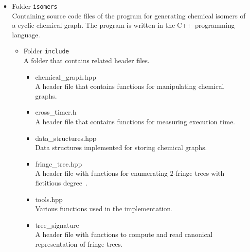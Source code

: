 \documentclass[11pt,titlepage,dvipdfmx,twoside]{article}
\begin{document}
%
\begin{itemize}
\item Folder {\tt isomers}\\
	Containing source code files of the program for generating chemical isomers of a cyclic chemical graph.
	The program is written in the C++ programming language.
	\begin{itemize}
	\item Folder {\tt include}\\
		A folder that contains related header files.
		\begin{itemize}
			\item{chemical\_graph.hpp}\\
			  A header file that contains functions for manipulating 
			  chemical graphs.
			\item{cross\_timer.h}\\
				A header file that contains functions for 
				measuring execution time.
				
			\item{data\_structures.hpp}\\
				Data structures implemented for storing 
				chemical graphs.
				
				
			\item{fringe\_tree.hpp}\\
				A header file with functions for enumerating 
				2-fringe trees with fictitious degree~\cite{branch}.
				
			\item{tools.hpp}\\
				Various functions used in the implementation.
				
			\item{tree\_signature}\\
				A header file with functions to compute and read canonical representation of fringe trees.
					

\end{itemize}
\end{itemize}
\end{itemize}
\end{document}
